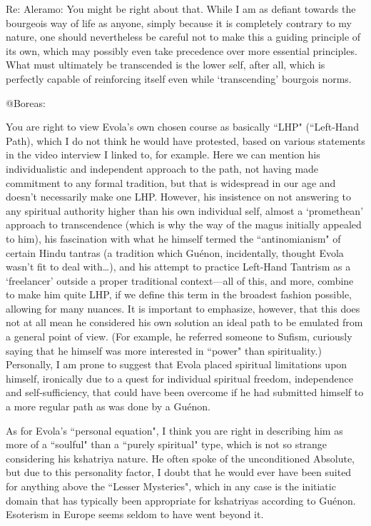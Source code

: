\begin{footnotesize}
\begin{sffamily}
Re: Aleramo: You might be right about that. While I am as defiant towards the bourgeois way of life as anyone, simply because it is completely contrary to my nature, one should nevertheless be careful not to make this a guiding principle of its own, which may possibly even take precedence over more essential principles. What must ultimately be transcended is the lower self, after all, which is perfectly capable of reinforcing itself even while `transcending' bourgois norms.

@Boreas:

You are right to view Evola's own chosen course as basically ``LHP" (``Left-Hand Path), which I do not think he would have protested, based on various statements in the video interview I linked to, for example. Here we can mention his individualistic and independent approach to the path, not having made commitment to any formal tradition, but that is widespread in our age and doesn't necessarily make one LHP. However, his insistence on not answering to any spiritual authority higher than his own individual self, almost a `promethean' approach to transcendence (which is why the way of the magus initially appealed to him), his fascination with what he himself termed the ``antinomianism" of certain Hindu tantras (a tradition which Guénon, incidentally, thought Evola wasn't fit to deal with…), and his attempt to practice Left-Hand Tantrism as a `freelancer' outside a proper traditional context—all of this, and more, combine to make him quite LHP, if we define this term in the broadest fashion possible, allowing for many nuances. It is important to emphasize, however, that this does not at all mean he considered his own solution an ideal path to be emulated from a general point of view. (For example, he referred someone to Sufism, curiously saying that he himself was more interested in ``power" than spirituality.) Personally, I am prone to suggest that Evola placed spiritual limitations upon himself, ironically due to a quest for individual spiritual freedom, independence and self-sufficiency, that could have been overcome if he had submitted himself to a more regular path as was done by a Guénon.

As for Evola's ``personal equation", I think you are right in describing him as more of a ``soulful" than a ``purely spiritual" type, which is not so strange considering his kshatriya nature. He often spoke of the unconditioned Absolute, but due to this personality factor, I doubt that he would ever have been suited for anything above the ``Lesser Mysteries", which in any case is the initiatic domain that has typically been appropriate for kshatriyas according to Guénon. Esoterism in Europe seems seldom to have went beyond it.


\end{sffamily}
\end{footnotesize}
